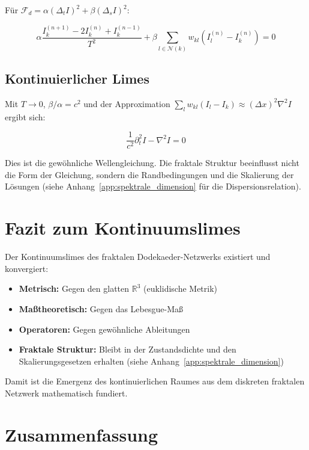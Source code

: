 Für \( \mathcal{F}_d = \alpha(\Delta_t I)^2 + \beta(\Delta_s I)^2 \):

\[
\alpha \frac{I_k^{(n+1)} - 2I_k^{(n)} + I_k^{(n-1)}}{T^2} +
\beta \sum_{l \in \mathcal{N}(k)} w_{kl}(I_l^{(n)} - I_k^{(n)}) = 0
\]

\subsection{Kontinuierlicher Limes}
\label{sub:kontinuumslimes_welle_kont}

Mit \( T \to 0 \), \( \beta/\alpha = c^2 \) und der Approximation
\( \sum_l w_{kl}(I_l - I_k) \approx (\Delta x)^2 \nabla^2 I \) ergibt sich:

\[
\frac{1}{c^2} \partial_t^2 I - \nabla^2 I = 0
\]

Dies ist die gewöhnliche Wellengleichung. Die fraktale Struktur beeinflusst
nicht die Form der Gleichung, sondern die Randbedingungen und die
Skalierung der Lösungen (siehe Anhang~\ref{app:spektrale_dimension} für die Dispersionsrelation).

\section{Fazit zum Kontinuumslimes}
\label{app:kontinuumslimes_fazit}

Der Kontinuumslimes des fraktalen Dodekaeder-Netzwerks existiert und konvergiert:

\begin{itemize}
    \item \textbf{Metrisch:} Gegen den glatten \( \mathbb{R}^3 \) (euklidische Metrik)
    \item \textbf{Maßtheoretisch:} Gegen das Lebesgue-Maß
    \item \textbf{Operatoren:} Gegen gewöhnliche Ableitungen
    \item \textbf{Fraktale Struktur:} Bleibt in der Zustandsdichte und den Skalierungsgesetzen
          erhalten (siehe Anhang~\ref{app:spektrale_dimension})
\end{itemize}

Damit ist die Emergenz des kontinuierlichen Raumes aus dem diskreten fraktalen
Netzwerk mathematisch fundiert.

\section{Zusammenfassung}
\label{app:kontinuumslimes_zusammenfassung}

